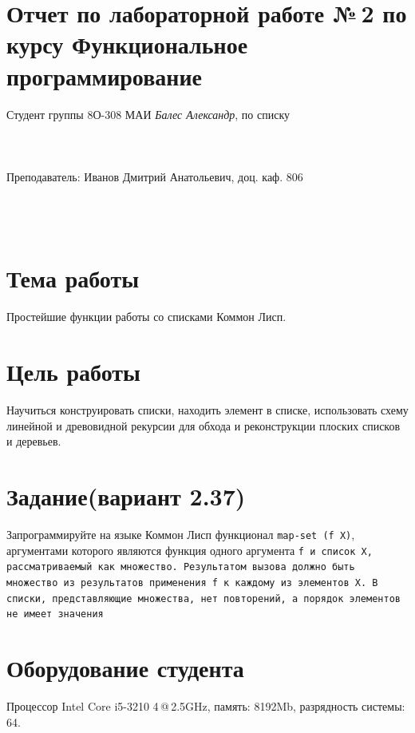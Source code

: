 \documentclass[12pt]{article}
\begin{document}
\section*{Отчет по лабораторной работе №\,2 
по курсу \guillemotleft  Функциональное программирование\guillemotright}
\begin{flushright}
Студент группы 8О-308 МАИ \textit{Балес Александр},  по списку \\
 \\
 \\
\ \\
Преподаватель: Иванов Дмитрий Анатольевич, доц. каф. 806 \\
 \\
 \\
 \\

\end{flushright}

\section{Тема работы}
Простейшие функции работы со списками Коммон Лисп.

\section{Цель работы}
Научиться конструировать списки, находить элемент в списке, использовать схему линейной и древовидной рекурсии для обхода и реконструкции плоских списков и деревьев.

\section{Задание(вариант 2.37)}
Запрограммируйте на языке Коммон Лисп функционал {\color{red}\tt{map-set (f X)}}, аргументами которого являются функция одного аргумента \tt{f} и список \tt{X}, рассматриваемый как множество. Результатом вызова должно быть множество из результатов применения \tt{f} к каждому из элементов \tt{X}. В списки, представляющие множества, нет повторений, а порядок элементов не имеет значения

\section{Оборудование студента}
Процессор Intel Core i5-3210 4\,@\,2.5GHz, память: 8192Mb, разрядность системы: 64.
\end{document}
